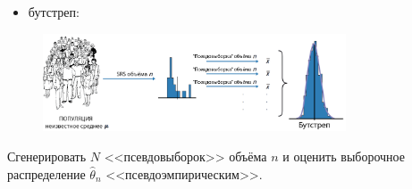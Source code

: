 \documentclass[11pt,pdf,utf8,hyperref={unicode},aspectratio=169]{beamer}
\begin{document}
\begin{frame}
		\begin{itemize}
			\item бутстреп:
		\end{itemize}
		\begin{figure}
			\includegraphics[width=0.8\textwidth]{boot3.png}
		\end{figure}
		Сгенерировать $N$ <<псевдовыборок>> объёма $n$ и оценить выборочное распределение $\hat{\theta}_n$ <<псевдоэмпирическим>>.

\end{frame}
\end{document}
